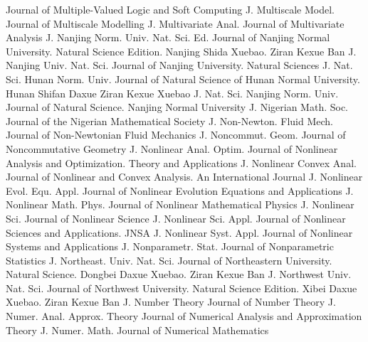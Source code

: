 {Journal of Multiple-Valued Logic and Soft Computing}
{J. Multiscale Model.}
{Journal of Multiscale Modelling}
{J. Multivariate Anal.}
{Journal of Multivariate Analysis}
{J. Nanjing Norm. Univ. Nat. Sci. Ed.}
{Journal of Nanjing Normal University. Natural Science Edition. Nanjing Shida Xuebao. Ziran Kexue Ban}
{J. Nanjing Univ. Nat. Sci.}
{Journal of Nanjing University. Natural Sciences}
{J. Nat. Sci. Hunan Norm. Univ.}
{Journal of Natural Science of Hunan Normal University. Hunan Shifan Daxue Ziran Kexue Xuebao}
{J. Nat. Sci. Nanjing Norm. Univ.}
{Journal of Natural Science. Nanjing Normal University}
{J. Nigerian Math. Soc.}
{Journal of the Nigerian Mathematical Society}
{J. Non-Newton. Fluid Mech.}
{Journal of Non-Newtonian Fluid Mechanics}
{J. Noncommut. Geom.}
{Journal of Noncommutative Geometry}
{J. Nonlinear Anal. Optim.}
{Journal of Nonlinear Analysis and Optimization. Theory and Applications}
{J. Nonlinear Convex Anal.}
{Journal of Nonlinear and Convex Analysis. An International Journal}
{J. Nonlinear Evol. Equ. Appl.}
{Journal of Nonlinear Evolution Equations and Applications}
{J. Nonlinear Math. Phys.}
{Journal of Nonlinear Mathematical Physics}
{J. Nonlinear Sci.}
{Journal of Nonlinear Science}
{J. Nonlinear Sci. Appl.}
{Journal of Nonlinear Sciences and Applications. JNSA}
{J. Nonlinear Syst. Appl.}
{Journal of Nonlinear Systems and Applications}
{J. Nonparametr. Stat.}
{Journal of Nonparametric Statistics}
{J. Northeast. Univ. Nat. Sci.}
{Journal of Northeastern University. Natural Science. Dongbei Daxue Xuebao. Ziran Kexue Ban}
{J. Northwest Univ. Nat. Sci.}
{Journal of Northwest University. Natural Science Edition. Xibei Daxue Xuebao. Ziran Kexue Ban}
{J. Number Theory}
{Journal of Number Theory}
{J. Numer. Anal. Approx. Theory}
{Journal of Numerical Analysis and Approximation Theory}
{J. Numer. Math.}
{Journal of Numerical Mathematics}

